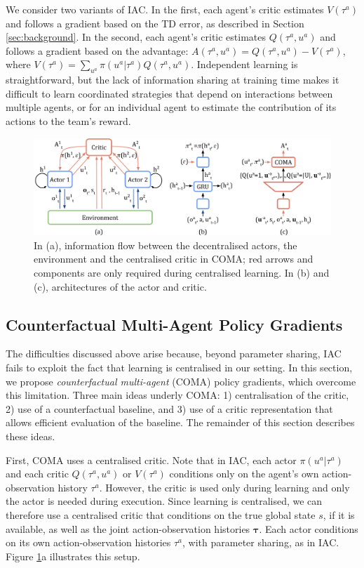\documentclass[letterpaper]{article}
\newcommand{\myvecsym}[1]{\boldsymbol{#1}}
\newcommand{\vtau}{\myvecsym{\tau}}
\begin{document}
We consider two variants of IAC. In the first, each agent's critic estimates $V(\tau^a)$ and follows a gradient based on the TD error, as described in Section \ref{sec:background}.  In the second, each agent's critic estimates $Q(\tau^a,u^a)$ and follows a gradient based on the advantage: $A(\tau^a, u^a) = Q(\tau^a,u^a)  - V(\tau^a)$, where $V(\tau^a) = \sum_{u^a}  \pi(u^a | \tau^a) Q(\tau^a,u^a)$. Independent learning is straightforward, but the lack of information sharing at training time makes it difficult to learn coordinated strategies that depend on interactions between multiple agents, or for an individual agent to estimate the contribution of its actions to the team's reward. 

\begin{figure}[ht]
\centering
	\includegraphics[width=0.9\linewidth]{shared/updated_joined_coma}
\caption{In (a), information flow between the decentralised actors, the environment and the centralised critic in COMA; red arrows and components are only required during centralised learning. In (b) and (c), architectures of the actor and critic. 
}
\label{fig:fig_1}
\end{figure}


\subsection{Counterfactual Multi-Agent Policy Gradients}
The difficulties discussed above arise because, beyond parameter sharing, IAC fails to exploit the fact that learning is centralised in our setting.  In this section, we propose \emph{counterfactual multi-agent} (COMA) policy gradients, which overcome this limitation.  Three main ideas underly COMA: 1) centralisation of the critic, 2) use of a counterfactual baseline, and 3) use of a critic representation that allows efficient evaluation of the baseline.  The remainder of this section describes these ideas.

First, COMA uses a centralised critic.  Note that in IAC, each actor $\pi(u^a | \tau^a)$  and each critic $ Q(\tau^a,u^a) $ or $ V(\tau^a)$ conditions only on the agent's own action-observation history $\tau^a$.  However, the critic is used only during learning and only the actor is needed during execution.  Since learning is centralised, we can therefore use a centralised critic that conditions on the true global state $s$, if it is available, as well as the joint action-observation histories $\vtau$. Each actor conditions on its own action-observation histories $\tau^a$, with parameter sharing, as in IAC.  Figure \ref{fig:fig_1}a illustrates this setup.
\end{document}
